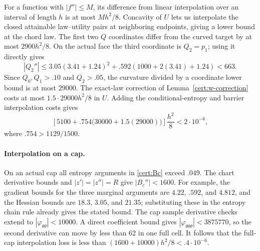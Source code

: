 \documentclass[11pt]{article}
\numberwithin{equation}{section}
\theoremstyle{definition}
\theoremstyle{remark}
\begin{document}
For a function with $|f''|\leq M$, its difference from linear
interpolation over an interval of length $h$ is at most $Mh^2/8$.
Concavity of $U$ lets us interpolate the closed attainable law--utility
pairs at neighboring endpoints, giving a lower bound at the chord law.
The first two $Q$ coordinates differ from the curved target by at most
$2900h^2/8$.  On the actual face the third coordinate is $Q_2=p_1$;
using it directly gives
\[
 |Q_2''|\leq3.05(3.41+1.24)^2
            +.592(1000+2(3.41)+1.24)<663.
\]
Since $Q_0,Q_1>.10$ and $Q_2>.05$, the curvature divided by a coordinate
lower bound is at most $29000$.  The exact-law correction of
Lemma~\ref{cert:w-correction} costs at most $1.5\cdot29000h^2/8$ in $U$.
Adding the conditional-entropy
and barrier interpolation costs gives
\begin{equation}\label{cert:face-interpolation}
 \left[5100+.754\bigl(30000+1.5(29000)\bigr)\right]\frac{h^2}{8}
       <2\cdot10^{-6},
\end{equation}
where $.754>1129/1500$.

\paragraph{Interpolation on a cap.}
On an actual cap all entropy arguments in \eqref{cert:Bc} exceed $.049$.
The chart derivative bounds and $|z'|=|z''|=R$ give
$|B_c''|<1600$.  For example, the gradient bounds for the three marginal
arguments are $4.22$, $.592$, and $4.812$, and the Hessian bounds are
$18.3$, $3.05$, and $21.35$; substituting these in the entropy chain rule
already gives the stated bound.  The cap sample derivative checks extend
to $|\varphi_{\theta\theta}|<10000$.  A direct coefficient bound gives
$|\varphi_{\theta\theta\theta}|<3875770$, so the second derivative
can move by less than 62 in one full cell.  It follows that the full-cap
interpolation loss is less than
$(1600+10000)h^2/8<.4\cdot10^{-6}$.
\end{document}
